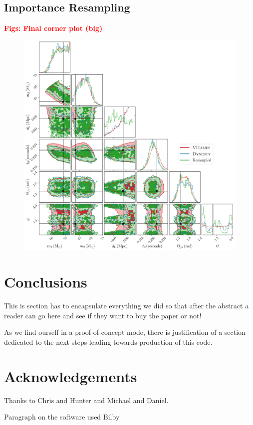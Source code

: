\documentclass[aps,superscriptaddress,twocolumn,nopreprintnumbers,floatfix,groupedaddress]{revtex4-1}
\newcommand{\bilby}{{\sc Bilby}\xspace}
\newcommand{\doublefigwidth}{17.2cm}
\begin{document}
\subsection{Importance Resampling}


\textbf{\textcolor{red}{Figs: Final corner plot (big)}}

\begin{figure}[h]
	\centering
	\includegraphics[width=\doublefigwidth]{figs/resample_corner.pdf}
	\caption{}
	\label{fig:final_corner}
\end{figure}



\section{Conclusions}\label{conc}

This is section has to encapsulate everything we did so that after the abstract a reader can go here and see if they want to buy the paper or not!

As we find ourself in a proof-of-concept mode, there is justification of a section dedicated to the next steps leading towards production of this code.


\section*{Acknowledgements}

Thanks to Chris and Hunter and Michael and Daniel.

Paragraph on the software used \bilby\cite{bilby} 

\end{document}
